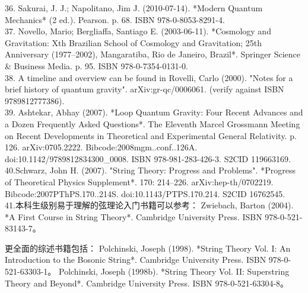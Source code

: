 36. Sakurai, J. J.; Napolitano, Jim J. (2010-07-14). *Modern Quantum Mechanics* (2 ed.). Pearson. p. 68. ISBN 978-0-8053-8291-4.\\
37. Novello, Mario; Bergliaffa, Santiago E. (2003-06-11). *Cosmology and Gravitation: Xth Brazilian School of Cosmology and Gravitation; 25th Anniversary (1977–2002), Mangaratiba, Rio de Janeiro, Brazil*. Springer Science & Business Media. p. 95. ISBN 978-0-7354-0131-0.\\
38. A timeline and overview can be found in Rovelli, Carlo (2000). "Notes for a brief history of quantum gravity". arXiv:gr-qc/0006061. (verify against ISBN 9789812777386).\\
39. Ashtekar, Abhay (2007). *Loop Quantum Gravity: Four Recent Advances and a Dozen Frequently Asked Questions*. The Eleventh Marcel Grossmann Meeting on Recent Developments in Theoretical and Experimental General Relativity. p. 126. arXiv:0705.2222. Bibcode:2008mgm..conf..126A. doi:10.1142/9789812834300_0008. ISBN 978-981-283-426-3. S2CID 119663169.\\
40.Schwarz, John H. (2007). "String Theory: Progress and Problems". *Progress of Theoretical Physics Supplement*. 170: 214–226. arXiv:hep-th/0702219. Bibcode:2007PThPS.170..214S. doi:10.1143/PTPS.170.214. S2CID 16762545.\\
41.本科生级别易于理解的弦理论入门书籍可以参考：  
Zwiebach, Barton (2004). *A First Course in String Theory*. Cambridge University Press. ISBN 978-0-521-83143-7。

更全面的综述书籍包括：  
Polchinski, Joseph (1998). *String Theory Vol. I: An Introduction to the Bosonic String*. Cambridge University Press. ISBN 978-0-521-63303-1。  
Polchinski, Joseph (1998b). *String Theory Vol. II: Superstring Theory and Beyond*. Cambridge University Press. ISBN 978-0-521-63304-8。


